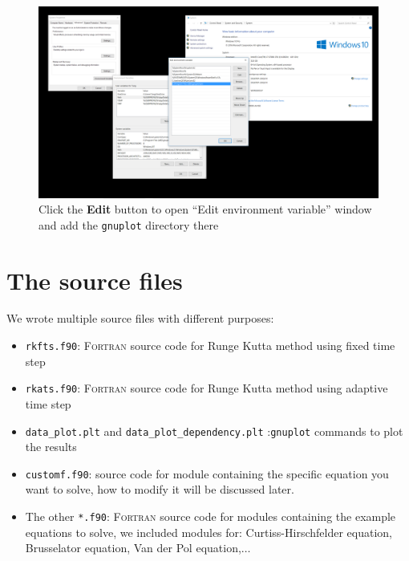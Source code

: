 \documentclass[a4paper,oneside]{book}
\numberwithin{equation}{chapter}
\begin{document}
	\begin{figure}[H]
		\centering	\includegraphics[width=15cm]{wfigextra5}
		\caption{Click the \textbf{Edit} button to open ``Edit environment variable'' window and add the \texttt{gnuplot} directory there}
	\end{figure}
	\section{The source files}\label{section2}
	We wrote multiple source files with different purposes:
	\begin{itemize}
		\item \texttt{rkfts.f90}: \textsc{Fortran} source code for Runge Kutta method using fixed time step
		\item \texttt{rkats.f90}: \textsc{Fortran} source code for Runge Kutta method using adaptive time step
		\item \texttt{data\_plot.plt} and \texttt{data\_plot\_dependency.plt} :\texttt{gnuplot} commands to plot the results
		\item \texttt{customf.f90}: source code for module containing the specific equation you want to solve, how to modify it will be discussed later.
		\item The other \texttt{*.f90}: \textsc{Fortran} source code for modules containing the example equations to solve, we included modules for: Curtiss-Hirschfelder equation, Brusselator equation, Van der Pol equation,$\dots$
	\end{itemize}
\end{document}
